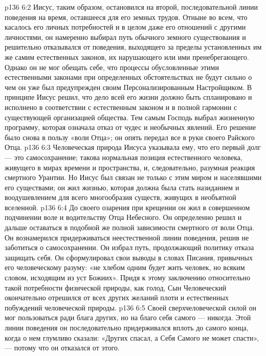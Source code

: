 \vs p136 6:2 Иисус, таким образом, остановился на второй, последовательной линии поведения на время, оставшееся для его земных трудов. Отныне во всем, что касалось его личных потребностей и в целом даже его отношений с другими личностями, он намеренно выбирал путь обычного земного существования и решительно отказывался от поведения, выходящего за пределы установленных им же самим естественных законов, их нарушающего или ими пренебрегающего. Однако он не мог обещать себе, что процессы обусловленные этими естественными законами при определенных обстоятельствах не будут сильно  о чем он уже был предупрежден своим Персонализированным Настройщиком. В принципе Иисус решил, что дело всей его жизни должно быть спланировано и исполнено в соответствии с естественным законом и в полной гармонии с существующей организацией общества. Тем самым Господь выбрал жизненную программу, которая означала отказ от чудес и необычных явлений. Его решение было снова в пользу «воли Отца»; он опять передал все в руки своего Райского Отца.
\vs p136 6:3 Человеческая природа Иисуса указывала ему, что его первый долг --- это самосохранение; такова нормальная позиция естественного человека, живущего в мирах времени и пространства, и, следовательно, разумная реакция смертного Урантии. Но Иисус был связан не только с этим миром и населявшими его существами; он жил жизнью, которая должна была стать назиданием и воодушевлением для всего многообразия существ, живущих в необъятной вселенной.
\vs p136 6:4 До своего озарения при крещении он жил в совершенном подчинении воле и водительству Отца Небесного. Он определенно решил и дальше оставаться в подобной же полной зависимости смертного от воли Отца. Он вознамерился придерживаться неестественной линии поведения, решив не заботиться о самосохранении. Он избрал путь, продолжающий политику отказа защищать себя. Он сформулировал свои выводы в словах Писания, привычных его человеческому разуму: «не хлебом одним будет жить человек, но всяким словом, исходящим из уст Божиих». Придя к этому заключению относительно такой потребности физической природы, как голод, Сын Человеческий окончательно отрешился от всех других желаний плоти и естественных побуждений человеческой природы.
\vs p136 6:5 Своей сверхчеловеческой силой он мог пользоваться ради блага других, но на благо себя самого --- никогда. Этой линии поведения он последовательно придерживался вплоть до самого конца, когда о нем глумливо сказали: «Других спасал, а Себя Самого не может спасти», --- потому что он отказался от этого.
